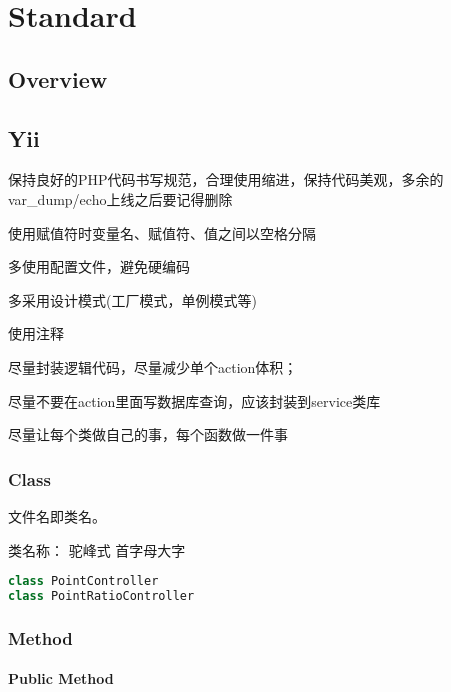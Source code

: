 \part{Standard}

\chapter{Overview}



\chapter{Yii}

\begin{compactitem}
\item 保持良好的PHP代码书写规范，合理使用缩进，保持代码美观，多余的var_dump/echo上线之后要记得删除
\item 使用赋值符时变量名、赋值符、值之间以空格分隔 
\item 多使用配置文件，避免硬编码  
\item 多采用设计模式(工厂模式，单例模式等)
\item 使用注释
\item 尽量封装逻辑代码，尽量减少单个action体积；
\item 尽量不要在action里面写数据库查询，应该封装到service类库
\item 尽量让每个类做自己的事，每个函数做一件事
\end{compactitem}





\section{Class}


文件名即类名。

类名称： 驼峰式 首字母大字 

\begin{lstlisting}[language=PHP]
class PointController 
class PointRatioController
\end{lstlisting}


\section{Method}


\subsection{Public Method}


